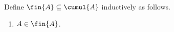 
\begin{inductive}\label{fin}
    Define $\fin{A}\subseteq\cumul{A}$ inductively as follows.
    \begin{enumerate}
        \item $A\in\fin{A}$.
    \end{enumerate}
\end{inductive}
